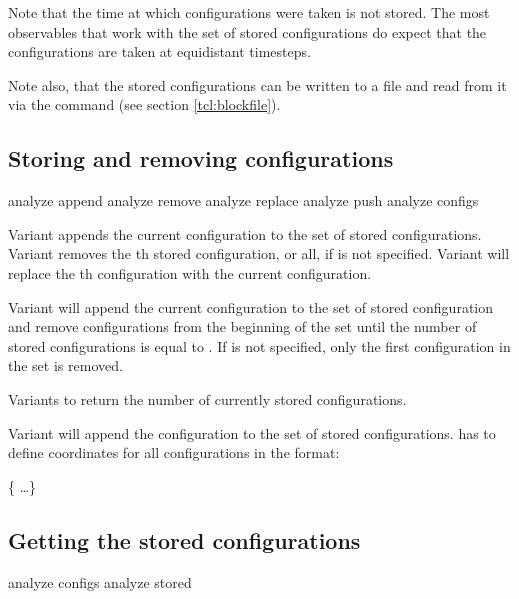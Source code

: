 Note that the time at which configurations were taken is not
stored.  The most observables that work with the set of stored
configurations do expect that the configurations are taken at
equidistant timesteps.

Note also, that the stored configurations can be written to a file and
read from it via the  command (see section
\vref{tcl:blockfile}).

\subsection{Storing and removing configurations}
\label{analyze:append}
\label{analyze:push}
\label{analyze:replace}
\label{analyze:remove}

\begin{essyntax}
   analyze append
   analyze remove 
   analyze replace  
   analyze push 
   analyze configs 
\end{essyntax}

Variant  appends the current configuration to the set of
stored configurations.  Variant  removes the th
stored configuration, or all, if  is not specified.  Variant
 will replace the th configuration with the
current configuration.

Variant  will append the current configuration to the set
of stored configuration and remove configurations from the beginning
of the set until the number of stored configurations is equal to
. If  is not specified, only the first
configuration in the set is removed.

Variants  to  return the number of currently
stored configurations.

Variant  will append the configuration  to the
set of stored configurations.  has to define coordinates
for all configurations in the format:
\begin{code}
 \{      \dots \}
\end{code}

\subsection{Getting the stored configurations}
\label{analyze:configs}
\label{analyze:stored}
\begin{essyntax}
   analyze configs
   analyze stored 
\end{essyntax}

